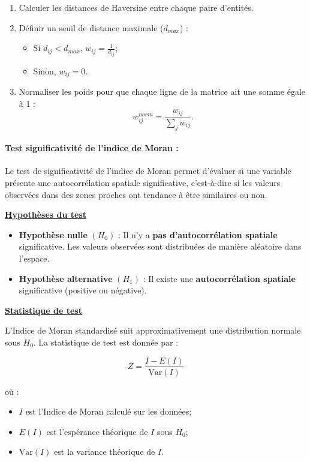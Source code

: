\documentclass[
]{article}
\providecommand{\tightlist}{%
  \setlength{\itemsep}{0pt}\setlength{\parskip}{0pt}}
\begin{document}
\begin{enumerate}
\def\labelenumi{\arabic{enumi}.}
\tightlist
\item
  Calculer les distances de Haversine entre chaque paire d'entités.
\item
  Définir un seuil de distance maximale (\(d_{max}\)) :

  \begin{itemize}
  \tightlist
  \item
    Si \(d_{ij} < d_{max}\), \(w_{ij} = \frac{1}{d_{ij}}\);
  \item
    Sinon, \(w_{ij} = 0\).
  \end{itemize}
\item
  Normaliser les poids pour que chaque ligne de la matrice ait une somme
  égale à 1 : \[
   w_{ij}^{norm} = \frac{w_{ij}}{\sum_{j} w_{ij}}.
  \]
\end{enumerate}

\paragraph{Test significativité de l'indice de Moran
:}\label{test-significativituxe9-de-lindice-de-moran}

Le test de significativité de l'indice de Moran permet d'évaluer si une
variable présente une autocorrélation spatiale significative,
c'est-à-dire si les valeurs observées dans des zones proches ont
tendance à être similaires ou non.

\underline{\textbf{Hypothèses du test}}

\begin{itemize}
    \item \textbf{Hypothèse nulle} \( (H_0) \) : Il n’y a \textbf{pas d’autocorrélation spatiale} significative. Les valeurs observées sont distribuées de manière aléatoire dans l’espace.
    \item \textbf{Hypothèse alternative} \( (H_1) \) : Il existe une \textbf{autocorrélation spatiale} significative (positive ou négative).
\end{itemize}

\underline{\textbf{Statistique de test}}

L'Indice de Moran standardisé suit approximativement une distribution
normale sous \(H_0\). La statistique de test est donnée par :

\[
    Z = \frac{I - E(I)}{\text{Var}(I)}
\]

où :

\begin{itemize}
    \item \( I \) est l’Indice de Moran calculé sur les données;
    \item \( E(I) \) est l’espérance théorique de \( I \) sous \( H_0 \);
    \item \( \text{Var}(I) \) est la variance théorique de \( I \).
\end{itemize}
\end{document}
